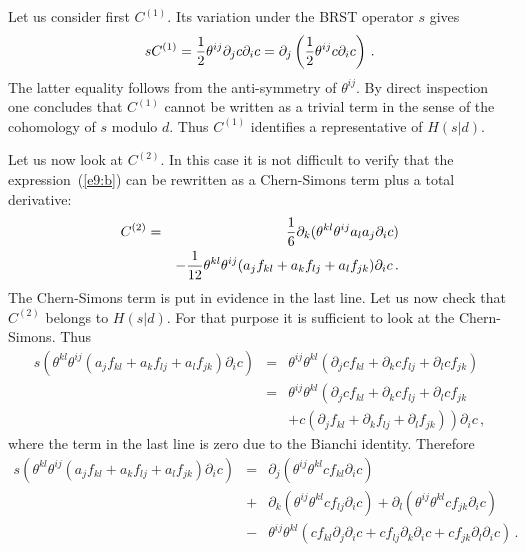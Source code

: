 \documentclass[a4paper,12pt]{article}
\begin{document}
Let us consider first $C^{(1)}$. 
Its variation under the BRST operator $s$ gives
%
\begin{eqnarray}
s C^{(1)} = {1 \over 2} \theta^{ij} \partial_j c \partial_i c =
\partial_j \left ( {1 \over 2} \theta^{ij} c \partial_i c \right ) \, .
\label{e21}
\end{eqnarray}
%
The latter equality follows from the anti-symmetry of $\theta^{ij}$.
By direct inspection one concludes that $C^{(1)}$ cannot be
 written as a trivial term in the sense of the cohomology of $s$ modulo $d$. 
Thus $C^{(1)}$ identifies a representative of $H(s|d)$.

Let us now look at $C^{(2)}$.
In this case it is not difficult to verify that the expression~(\ref{e9:b})
 can be rewritten as a Chern-Simons term plus a total derivative:
%
\begin{eqnarray}
C^{(2)} & = & {1 \over 6} \partial_k ( \theta^{kl} \theta^{ij} 
a_l a_j \partial_i c ) \nonumber \\
& & - {1 \over 12} \theta^{kl}\theta^{ij} (a_j f_{kl}
+a_k f_{lj} + a_l f_{jk}) \partial_i c \, .
\label{e22}
\end{eqnarray}
%
The Chern-Simons term is put in evidence in the last line. 
Let us now check that $C^{(2)}$ belongs to $H(s|d)$.
For that purpose it is sufficient to look at the Chern-Simons. Thus
%
\begin{eqnarray}
s \left ( \theta^{kl}\theta^{ij} ( a_j f_{kl}
				 + a_k f_{lj}
                                 + a_l f_{jk}) \partial_i c \right ) & = &
\theta^{ij} \theta^{kl} \left ( \partial_j c f_{kl}
                              + \partial_k c f_{lj}
                              + \partial_l c f_{jk} \right ) \nonumber \\
& = & \theta^{ij} \theta^{kl} \left ( \partial_j c f_{kl}
                                    + \partial_k c f_{lj}
                                    + \partial_l c f_{jk} \right . \nonumber \\
& & \left . +c (\partial_j f_{kl} + \partial_k f_{lj} + \partial_l f_{jk} 
) \right ) \partial_i c \, ,
\label{e23}
\end{eqnarray}
%
where the term in the last line is zero due to the Bianchi identity.
Therefore
%
\begin{eqnarray}
s \left ( \theta^{kl}\theta^{ij} (a_j f_{kl}
+a_k f_{lj} + a_l f_{jk}) \partial_i c \right ) & = &
\partial_j (\theta^{ij} \theta^{kl} c f_{kl} \partial_i c) \nonumber \\
& +& 
\partial_k (\theta^{ij} \theta^{kl} c f_{lj} \partial_i c) +
\partial_l (\theta^{ij} \theta^{kl} c f_{jk} \partial_i c)\\
&  -& \theta^{ij}\theta^{kl}\left(
	 c f_{kl} \partial_j \partial_i c 
	+ c f_{lj} \partial_k \partial_i c 
    	+ c f_{jk} \partial_l \partial_i c\right) \, . \nonumber 
\label{e25}
\end{eqnarray}
\end{document}
